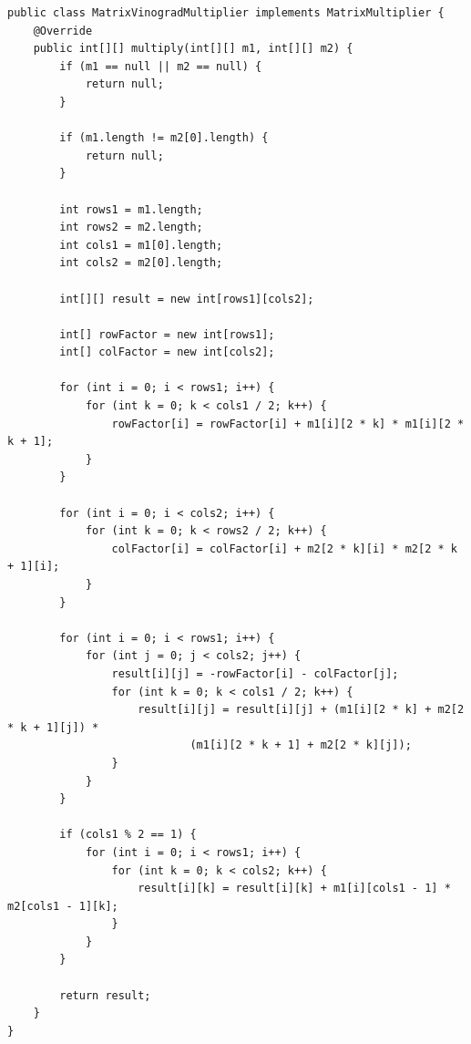 \documentclass[12pt]{report}
\begin{document}
    \begin{lstlisting}[caption=Алгоритм Копперсмита-Винограда, label=code:vinogradCasual, justification=RaggedRight]
    public class MatrixVinogradMultiplier implements MatrixMultiplier {
    @Override
    public int[][] multiply(int[][] m1, int[][] m2) {
        if (m1 == null || m2 == null) {
            return null;
        }

        if (m1.length != m2[0].length) {
            return null;
        }

        int rows1 = m1.length;
        int rows2 = m2.length;
        int cols1 = m1[0].length;
        int cols2 = m2[0].length;

        int[][] result = new int[rows1][cols2];

        int[] rowFactor = new int[rows1];
        int[] colFactor = new int[cols2];

        for (int i = 0; i < rows1; i++) {
            for (int k = 0; k < cols1 / 2; k++) {
                rowFactor[i] = rowFactor[i] + m1[i][2 * k] * m1[i][2 * k + 1];
            }
        }

        for (int i = 0; i < cols2; i++) {
            for (int k = 0; k < rows2 / 2; k++) {
                colFactor[i] = colFactor[i] + m2[2 * k][i] * m2[2 * k + 1][i];
            }
        }

        for (int i = 0; i < rows1; i++) {
            for (int j = 0; j < cols2; j++) {
                result[i][j] = -rowFactor[i] - colFactor[j];
                for (int k = 0; k < cols1 / 2; k++) {
                    result[i][j] = result[i][j] + (m1[i][2 * k] + m2[2 * k + 1][j]) *
                            (m1[i][2 * k + 1] + m2[2 * k][j]);
                }
            }
        }

        if (cols1 % 2 == 1) {
            for (int i = 0; i < rows1; i++) {
                for (int k = 0; k < cols2; k++) {
                    result[i][k] = result[i][k] + m1[i][cols1 - 1] * m2[cols1 - 1][k];
                }
            }
        }

        return result;
    }
}
    \end{lstlisting}
\end{document}
